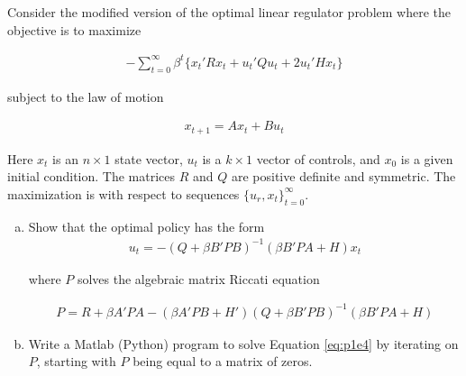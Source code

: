 
\newcommand{\pu} {\left[ - (Q + \beta B'BP)^{-1} (H + \beta B'PA)x \right]}
\newcommand{\puprime} {\left[ - x'(\beta A'PB + H')(Q + \beta B'PB)^{-1} \right]}


\begin{homeworkProblem}[Problem 5.1]

Consider the modified version of the optimal linear regulator problem where the objective is to maximize

\begin{align} \label{eq:p1e1}
  - \sum_{t=0}^{\infty} \beta^t \{ x_t' R x_t + u_t'Qu_t + 2 u_t' H x_t \}
\end{align}

subject to the law of motion

\begin{align} \label{eq:p1e2}
  x_{t+1} = Ax_t + B u_t
\end{align}

Here $x_t$ is an $n \times 1$ state vector, $u_t$ is a $k \times 1$ vector of controls, and $x_0$ is a given initial condition. The matrices $R$ and $Q$ are positive definite and symmetric. The maximization is with respect to sequences $\{u_r, x_t\}_{t=0}^{\infty}$.

\begin{enumerate}[a.]
  \item Show that the optimal policy has the form
    \begin{align} \label{eq:p1e3}
      u_t = - \left(Q + \beta B' P B \right)^{-1} \left(\beta B' P A + H \right) x_t
    \end{align}

    where $P$ solves the algebraic matrix Riccati equation

    \begin{align} \label{eq:p1e4}
      P = R + \beta A' P A - \left(\beta A' P B + H' \right)\left(Q + \beta B'P B \right)^{-1} \left(\beta B' P A + H \right)
    \end{align}

  \item  Write a Matlab (Python) program to solve Equation \ref{eq:p1e4} by iterating on $P$, starting with $P$ being equal to a matrix of zeros.

  \end{enumerate}

  \vspace{.2in}

  \problemAnswer{

}
\end{homeworkProblem}
